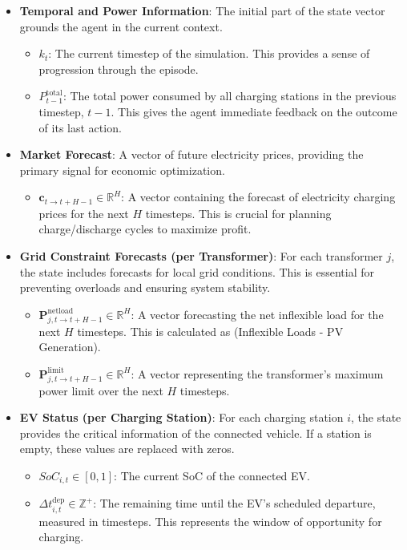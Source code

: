 \begin{itemize}
    \item \textbf{Temporal and Power Information}: The initial part of the state vector grounds the agent in the current context.
    \begin{itemize}
        \item $k_t$: The current timestep of the simulation. This provides a sense of progression through the episode.
        \item $P_{t-1}^{\text{total}}$: The total power consumed by all charging stations in the previous timestep, $t-1$. This gives the agent immediate feedback on the outcome of its last action.
    \end{itemize}

    \item \textbf{Market Forecast}: A vector of future electricity prices, providing the primary signal for economic optimization.
    \begin{itemize}
        \item $\mathbf{c}_{t \rightarrow t+H-1} \in \mathbb{R}^{H}$: A vector containing the forecast of electricity charging prices for the next $H$ timesteps. This is crucial for planning charge/discharge cycles to maximize profit.
    \end{itemize}

    \item \textbf{Grid Constraint Forecasts (per Transformer)}: For each transformer $j$, the state includes forecasts for local grid conditions. This is essential for preventing overloads and ensuring system stability.
    \begin{itemize}
        \item $\mathbf{P}_{j, t \rightarrow t+H-1}^{\text{netload}} \in \mathbb{R}^{H}$: A vector forecasting the net inflexible load for the next $H$ timesteps. This is calculated as (Inflexible Loads - PV Generation).
        \item $\mathbf{P}_{j, t \rightarrow t+H-1}^{\text{limit}} \in \mathbb{R}^{H}$: A vector representing the transformer's maximum power limit over the next $H$ timesteps.
    \end{itemize}

    \item \textbf{EV Status (per Charging Station)}: For each charging station $i$, the state provides the critical information of the connected vehicle. If a station is empty, these values are replaced with zeros.
    \begin{itemize}
        \item $SoC_{i,t} \in [0, 1]$: The current SoC of the connected EV.
        \item $\Delta t_{i,t}^{\text{dep}} \in \mathbb{Z}^+$: The remaining time until the EV's scheduled departure, measured in timesteps. This represents the window of opportunity for charging.
    \end{itemize}
\end{itemize}

